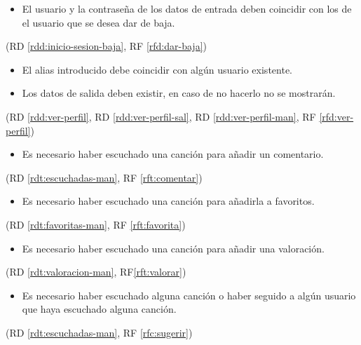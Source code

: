 \begin{itemize}
\item El usuario y la contraseña de los datos de entrada deben coincidir con los de el usuario que se desea dar de baja.
\end{itemize}
(RD \ref{rdd:inicio-sesion-baja}, RF \ref{rfd:dar-baja})

\begin{itemize}
\item El alias introducido debe coincidir con algún usuario existente.
\item Los datos de salida deben existir, en caso de no hacerlo no se mostrarán.
\end{itemize}
(RD \ref{rdd:ver-perfil}, RD \ref{rdd:ver-perfil-sal}, RD \ref{rdd:ver-perfil-man}, RF \ref{rfd:ver-perfil})


\begin{itemize}
\item Es necesario haber escuchado una canción para añadir un comentario.
\end{itemize}
(RD \ref{rdt:escuchadas-man}, RF \ref{rft:comentar})\label{rst:comentar}

\begin{itemize}
\item Es necesario haber escuchado una canción para añadirla a favoritos.
\end{itemize}
(RD \ref{rdt:favoritas-man}, RF \ref{rft:favorita})\label{rst:favorita}

\begin{itemize}
\item Es necesario haber escuchado una canción para añadir una valoración.
\end{itemize}
(RD \ref{rdt:valoracion-man}, RF\ref{rft:valorar})\label{rst:valorar}


%
\begin{itemize}
\item Es necesario haber escuchado alguna canción o haber seguido a algún usuario que haya escuchado alguna canción.
\end{itemize}
(RD \ref{rdt:escuchadas-man}, RF \ref{rfc:sugerir})

